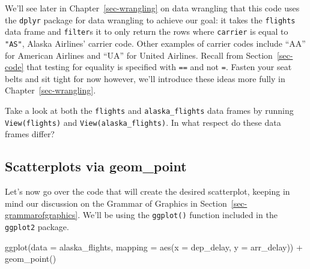\documentclass[
  letterpaper,
  DIV=11,
  numbers=noendperiod]{scrreprt}
\newenvironment{Shaded}{\begin{snugshade}}{\end{snugshade}}
\newcommand{\AttributeTok}[1]{\textcolor[rgb]{0.40,0.45,0.13}{#1}}
\newcommand{\FunctionTok}[1]{\textcolor[rgb]{0.28,0.35,0.67}{#1}}
\newcommand{\NormalTok}[1]{\textcolor[rgb]{0.00,0.23,0.31}{#1}}
\newcommand{\SpecialCharTok}[1]{\textcolor[rgb]{0.37,0.37,0.37}{#1}}
\theoremstyle{definition}
\theoremstyle{remark}
\begin{document}
We'll see later in Chapter~\ref{sec-wrangling} on data wrangling that
this code uses the \texttt{dplyr} package for data wrangling to achieve
our goal: it takes the \texttt{flights} data frame and \texttt{filter}s
it to only return the rows where \texttt{carrier} is equal to
\texttt{"AS"}, Alaska Airlines' carrier code. Other examples of carrier
codes include ``AA'' for American Airlines and ``UA'' for United
Airlines. Recall from Section~\ref{sec-code} that testing for equality
is specified with \texttt{==} and not \texttt{=}. Fasten your seat belts
and sit tight for now however, we'll introduce these ideas more fully in
Chapter~\ref{sec-wrangling}.

\begin{tcolorbox}[enhanced jigsaw, colback=white, toprule=.15mm, bottomrule=.15mm, titlerule=0mm, title={{🎯} Learning Check 2.1}, leftrule=.75mm, arc=.35mm, left=2mm, colframe=quarto-callout-tip-color-frame, coltitle=black, opacitybacktitle=0.6, bottomtitle=1mm, colbacktitle=quarto-callout-tip-color!10!white, opacityback=0, toptitle=1mm, rightrule=.15mm, breakable]

Take a look at both the \texttt{flights} and \texttt{alaska\_flights}
data frames by running \texttt{View(flights)} and
\texttt{View(alaska\_flights)}. In what respect do these data frames
differ?

\end{tcolorbox}

\hypertarget{sec-geompoint}{%
\subsection{Scatterplots via geom\_point}\label{sec-geompoint}}

Let's now go over the code that will create the desired scatterplot,
keeping in mind our discussion on the Grammar of Graphics in
Section~\ref{sec-grammarofgraphics}. We'll be using the
\texttt{ggplot()} function included in the \texttt{ggplot2} package.

\begin{Shaded}
\begin{Highlighting}[]
\FunctionTok{ggplot}\NormalTok{(}\AttributeTok{data =}\NormalTok{ alaska\_flights, }\AttributeTok{mapping =} \FunctionTok{aes}\NormalTok{(}\AttributeTok{x =}\NormalTok{ dep\_delay, }\AttributeTok{y =}\NormalTok{ arr\_delay)) }\SpecialCharTok{+} 
  \FunctionTok{geom\_point}\NormalTok{()}
\end{Highlighting}
\end{Shaded}
\end{document}
